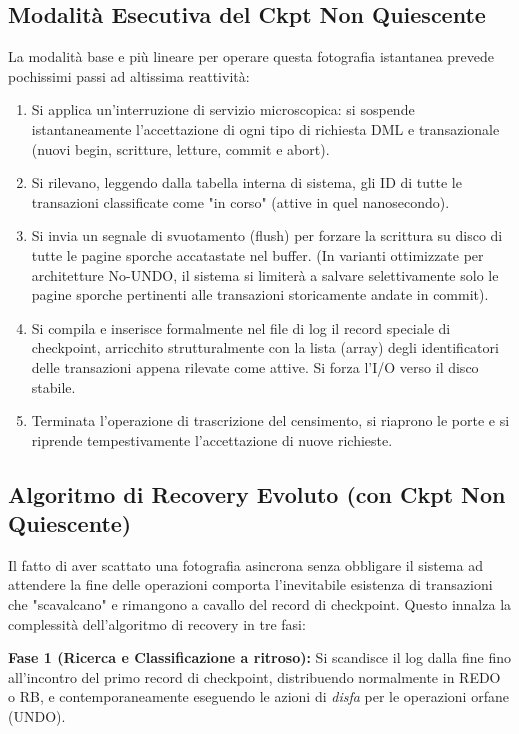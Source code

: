 \subsection{Modalità Esecutiva del Ckpt Non Quiescente}
La modalità base e più lineare per operare questa fotografia istantanea prevede pochissimi passi ad altissima reattività:
\begin{enumerate}
    \item Si applica un'interruzione di servizio microscopica: si sospende istantaneamente l'accettazione di ogni tipo di richiesta DML e transazionale (nuovi begin, scritture, letture, commit e abort).
    \item Si rilevano, leggendo dalla tabella interna di sistema, gli ID di tutte le transazioni classificate come "in corso" (attive in quel nanosecondo).
    \item Si invia un segnale di svuotamento (flush) per forzare la scrittura su disco di tutte le pagine sporche accatastate nel buffer. (In varianti ottimizzate per architetture No-UNDO, il sistema si limiterà a salvare selettivamente solo le pagine sporche pertinenti alle transazioni storicamente andate in commit).
    \item Si compila e inserisce formalmente nel file di log il record speciale di checkpoint, arricchito strutturalmente con la lista (array) degli identificatori delle transazioni appena rilevate come attive. Si forza l'I/O verso il disco stabile.
    \item Terminata l'operazione di trascrizione del censimento, si riaprono le porte e si riprende tempestivamente l'accettazione di nuove richieste.
\end{enumerate}

\subsection{Algoritmo di Recovery Evoluto (con Ckpt Non Quiescente)}
Il fatto di aver scattato una fotografia asincrona senza obbligare il sistema ad attendere la fine delle operazioni comporta l'inevitabile esistenza di transazioni che "scavalcano" e rimangono a cavallo del record di checkpoint. Questo innalza la complessità dell'algoritmo di recovery in tre fasi:

\textbf{Fase 1 (Ricerca e Classificazione a ritroso):}
Si scandisce il log dalla fine fino all'incontro del primo record di checkpoint, distribuendo normalmente in REDO o RB, e contemporaneamente eseguendo le azioni di \textit{disfa} per le operazioni orfane (UNDO).

